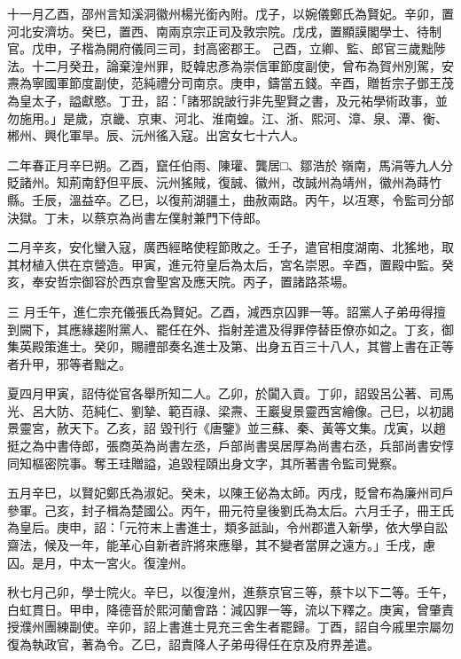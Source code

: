 \begin{pinyinscope}
 十一月乙酉，邵州言知溪洞徽州楊光銜內附。戊子，以婉儀鄭氏為賢妃。辛卯，置河北安濟坊。癸巳，置西、南兩京宗正司及敦宗院。戊戌，置顯謨閣學士、待制官。戊申，子楷為開府儀同三司，封高密郡王。
 己酉，立卿、監、郎官三歲黜陟法。十二月癸丑，論棄湟州罪，貶韓忠彥為崇信軍節度副使，曾布為賀州別駕，安燾為寧國軍節度副使，范純禮分司南京。庚申，鑄當五錢。辛酉，贈哲宗子鄧王茂為皇太子，謚獻愍。丁丑，詔：「諸邪說詖行非先聖賢之書，及元祐學術政事，並勿施用。」是歲，京畿、京東、河北、淮南蝗。江、浙、熙河、漳、泉、潭、衡、郴州、興化軍旱。辰、沅州徭入寇。出宮女七十六人。



 二年春正月辛巳朔。乙酉，竄任伯雨、陳瓘、龔居□、鄒浩於
 嶺南，馬涓等九人分貶諸州。知荊南舒但平辰、沅州猺賊，復誠、徽州，改誠州為靖州，徽州為蒔竹縣。壬辰，溫益卒。乙巳，以復荊湖疆土，曲赦兩路。丙午，以冱寒，令監司分部決獄。丁未，以蔡京為尚書左僕射兼門下侍郎。



 二月辛亥，安化蠻入寇，廣西經略使程節敗之。壬子，遣官相度湖南、北猺地，取其材植入供在京營造。甲寅，進元符皇后為太后，宮名崇恩。辛酉，置殿中監。癸亥，奉安哲宗御容於西京會聖宮及應天院。丙子，置諸路茶場。



 三
 月壬午，進仁宗充儀張氏為賢妃。乙酉，減西京囚罪一等。詔黨人子弟毋得擅到闕下，其應緣趨附黨人、罷任在外、指射差遣及得罪停替臣僚亦如之。丁亥，御集英殿策進士。癸卯，賜禮部奏名進士及第、出身五百三十八人，其嘗上書在正等者升甲，邪等者黜之。



 夏四月甲寅，詔侍從官各舉所知二人。乙卯，於闐入貢。丁卯，詔毀呂公著、司馬光、呂大防、范純仁、劉摯、範百祿、梁燾、王巖叟景靈西宮繪像。己巳，以初謁景靈宮，赦天下。乙亥，詔
 毀刊行《唐鑒》並三蘇、秦、黃等文集。戊寅，以趙挺之為中書侍郎，張商英為尚書左丞，戶部尚書吳居厚為尚書右丞，兵部尚書安惇同知樞密院事。奪王珪贈謚，追毀程頤出身文字，其所著書令監司覺察。



 五月辛巳，以賢妃鄭氏為淑妃。癸未，以陳王佖為太師。丙戌，貶曾布為廉州司戶參軍。己亥，封子楫為楚國公。丙午，冊元符皇後劉氏為太后。六月壬子，冊王氏為皇后。庚申，詔：「元符末上書進士，類多詆訕，令州郡遣入新學，依大學自訟
 齋法，候及一年，能革心自新者許將來應舉，其不變者當屏之遠方。」壬戌，慮囚。是月，中太一宮火。復湟州。



 秋七月己卯，學士院火。辛巳，以復湟州，進蔡京官三等，蔡卞以下二等。壬午，白虹貫日。甲申，降德音於熙河蘭會路：減囚罪一等，流以下釋之。庚寅，曾肇責授濮州團練副使。辛卯，詔上書進士見充三舍生者罷歸。丁酉，詔自今戚里宗屬勿復為執政官，著為令。乙巳，詔責降人子弟毋得任在京及府界差遣。




\end{pinyinscope}
